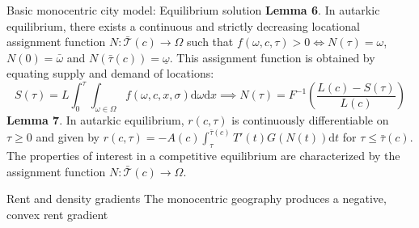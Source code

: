 \documentclass[11pt,notes=hide,aspectratio=169]{beamer}
\begin{document}
\begin{frame}{Basic monocentric city model: Equilibrium solution}
\textbf{Lemma 6}.
In autarkic equilibrium,
there exists a continuous and strictly decreasing locational assignment
function $N:\bar{\mathcal{T}}(c)\to\Omega$ such that $f(\omega,c,\tau)>0\iff N(\tau)=\omega$,
$N(0)=\bar{\omega}$ and $N(\bar{\tau}(c))=\underline{\omega}$.
This assignment function is obtained by equating supply and demand
of locations: 
\begin{equation*}
S(\tau) 
=
L\int_{0}^{\tau}\int_{\omega\in\Omega}f(\omega,c,x,\sigma)\textrm{d}\omega\textrm{d} x
\implies
N(\tau) 
=
F^{-1}\left(\frac{L(c)-S(\tau)}{L(c)}\right)
\end{equation*}
\textbf{Lemma 7}.
In autarkic equilibrium, $r(c,\tau)$
is continuously differentiable on $\tau\geq0$ and given by \textup{$r(c,\tau)=-A(c)\int_{\tau}^{\bar{\tau}(c)}T'(t)G(N(t))\textrm{d} t$
for $\tau\leq\bar{\tau}(c)$.}
The properties of interest in a competitive equilibrium are characterized
by the assignment function $N:\bar{\mathcal{T}}(c)\to\Omega$.
\end{frame}
\begin{frame}{Rent and density gradients}
The monocentric geography produces a negative, convex rent gradient
\begin{center}
\end{center}
\end{frame}
\end{document}

